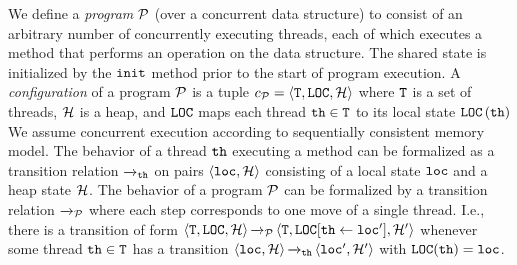 We define a {\em program} ${\mathcal P}$ (over a concurrent data structure) to consist 
of an arbitrary number of concurrently executing threads, each of which
executes a method
that performs an operation on the data structure.
The shared state is initialized
by the $\tt init$ method prior to the start of program execution.
A {\it configuration} of a program ${\mathcal P}$ is a tuple
$c_{{\mathcal P}} = \left\langle{\tt T},{\tt LOC},{\mathcal H}\right\rangle$ where
${\tt T}$ is a set of threads,
${\mathcal H}$ is a heap, and ${\tt LOC}$
maps each thread ${\tt th}\in{\tt T}$ to its
local state ${\tt LOC}\left({\tt th}\right)$
We assume concurrent execution according to sequentially consistent memory
model.
The behavior of a thread ${\tt th}$ executing a method can be formalized as 
a transition relation ${\xrightarrow{}{}}_{\!\!{\tt th}}$
on pairs $\left\langle{\tt loc},{\mathcal H}\right\rangle$ consisting of a local state
${\tt loc}$ and a heap state ${\mathcal H}$.
The behavior of a program ${\mathcal P}$ can be formalized by a transition relation
${\xrightarrow{}{}}_{\!\!{\mathcal P}}$ where each step corresponds to one move of a single thread.
I.e., 
there is a transition of form
$\left\langle{\tt T},{\tt LOC},{\mathcal H}\right\rangle
{\xrightarrow{}{}}_{\!\!{\mathcal P}}
\left\langle{\tt T},{\tt LOC}[{\tt th}\leftarrow{\tt loc}'],{\mathcal H}'\right\rangle$
whenever some thread ${\tt th} \in {\tt T}$
has a transition
$\left\langle{\tt loc},{\mathcal H}\right\rangle{\xrightarrow{}{}}_{\!\!{\tt th}}\left\langle{\tt loc}',{\mathcal H}'\right\rangle$
with ${\tt LOC}({\tt th}) = {\tt loc}$.

